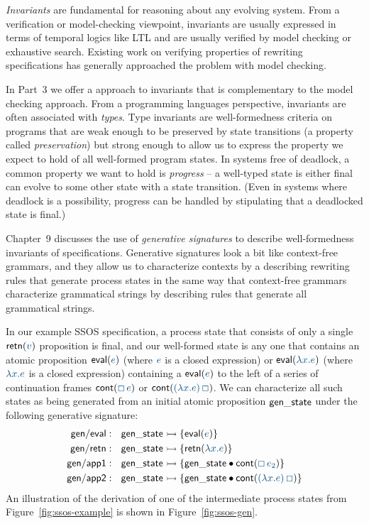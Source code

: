 {\it Invariants} are fundamental for reasoning about any evolving
system. From a verification or model-checking viewpoint, invariants
are usually expressed in terms of temporal logics like LTL and are
usually verified by model checking or exhaustive search. Existing work
on verifying properties of rewriting specifications has generally
approached the problem with model checking. 

In Part~3 we offer a approach to invariants that is complementary to
the model checking approach.  From a programming languages
perspective, invariants are often associated with {\it types}. Type
invariants are well-formedness criteria on programs that are weak
enough to be preserved by state transitions (a property called {\it
  preservation}) but strong enough to allow us to express the property
we expect to hold of all well-formed program states. In systems free
of deadlock, a common property we want to hold is {\it progress} -- a
well-typed state is either final can evolve to some other state with a
state transition. (Even in systems where deadlock is a possibility,
progress can be handled by stipulating that a deadlocked state is
final.)

Chapter~9 discusses the use of {\it generative signatures} to
describe well-formedness invariants of specifications. Generative
signatures look a bit like context-free grammars, and they allow us to
characterize contexts by a describing rewriting rules that generate
process states in the same way that context-free grammars characterize
grammatical strings by describing rules that generate all grammatical
strings.

In our example SSOS specification, a process state that consists of
only a single ${\sf retn}(\obj{v})$ proposition is final, and our
well-formed state is any one that contains an atomic proposition ${\sf
  eval}(\obj{e})$ (where $\obj{e}$ is a closed expression) or ${\sf
  eval}(\obj{\lambda x. e})$ (where $\obj{\lambda x. e}$ is a closed
expression) containing a ${\sf eval}(\obj{e})$ to the left 
of a series of continuation frames ${\sf cont}(\obj{\Box\,e})$ 
or ${\sf cont}(\obj{(\lambda x.e)\,\Box})$. We can characterize 
all such states as being generated from an initial atomic 
proposition ${\sf gen\_state}$ under the following generative
signature:
\begin{align*}
{\sf gen/eval} &:~~
  {\sf gen\_state} \lefti \{ {\sf eval}(\obj{e}) \}
\\
{\sf gen/retn} &:~~
  {\sf gen\_state} \lefti \{ {\sf retn}(\obj{\lambda x.e}) \}
\\
{\sf gen/app1} &:~~
  {\sf gen\_state} 
    \lefti \{ {\sf gen\_state} \fuse {\sf cont}(\obj{\Box\,e_2}) \}
\\
{\sf gen/app2} &:~~
  {\sf gen\_state} 
    \lefti \{ {\sf gen\_state} \fuse {\sf cont}(\obj{(\lambda x.e)\,\Box}) \}
\end{align*}
An illustration of the derivation of one of the intermediate process
states from Figure~\ref{fig:ssos-example} is shown in
Figure~\ref{fig:ssos-gen}.

